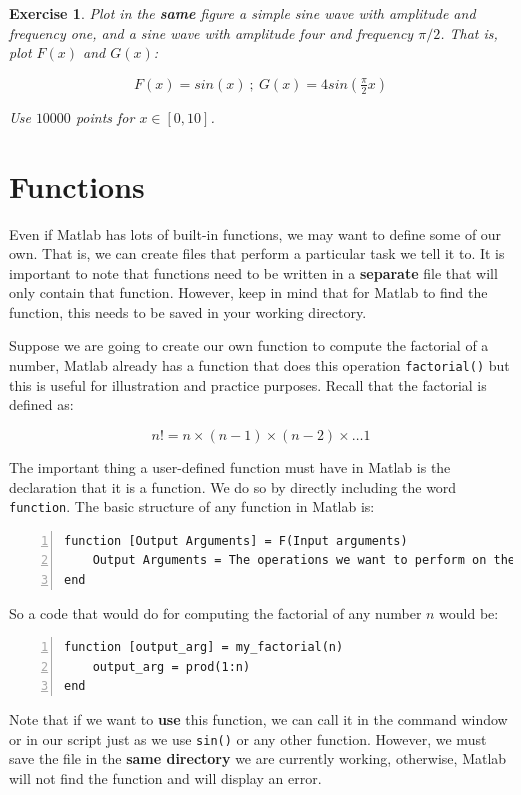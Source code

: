 \documentclass[a4paper,11pt]{article}
\newtheorem{exercise}{Exercise}
\begin{document}
\begin{exercise}
Plot in the \textbf{same} figure a simple sine wave with amplitude and frequency one, and a sine wave with amplitude four and frequency $\pi/2$. That is, plot $F(x)$ and $G(x)$:

\[
F(x) = sin(x) \ ; \ G(x) = 4sin(\tfrac{\pi}{2}x)
\]

Use $10000$ points for $x\in[0,10]$.
\end{exercise}

\section{Functions}

Even if Matlab has lots of built-in functions, we may want to define some of our own. That is, we can create files that perform a particular task we tell it to. It is important to note that functions need to be written in a \textbf{separate} file that will only contain that function. However, keep in mind that for Matlab to find the function, this needs to be saved in your working directory.

Suppose we are going to create our own function to compute the factorial of a number, Matlab already has a function that does this operation \texttt{factorial()} but this is useful for illustration and practice purposes. Recall that the factorial is defined as:

\[
n! = n\times(n-1)\times(n-2)\times \ldots 1 
\]

The important thing a user-defined function must have in Matlab is the declaration that it is a function. We do so by directly including the word \texttt{function}. The basic structure of any function in Matlab is:

\begin{Verbatim}[numbers=left]
function [Output Arguments] = F(Input arguments)
	Output Arguments = The operations we want to perform on the Input Arguments
end
\end{Verbatim}

So a code that would do for computing the factorial of any number $n$ would be:

\begin{Verbatim}[numbers=left]
function [output_arg] = my_factorial(n) 
	output_arg = prod(1:n)
end
\end{Verbatim}

Note that if we want to \textbf{use} this function, we can call it in the command window or in our script just as we use \verb;sin(); or any other function. However, we must save the file in the \textbf{same directory} we are currently working, otherwise, Matlab will not find the function and will display an error.
\end{document}
